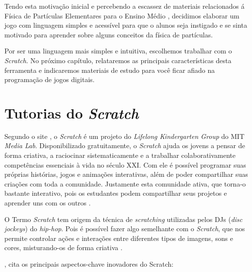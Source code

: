 \documentclass[12pt,fleqn]{book} %
\begin{document}
Tendo esta motivação inicial e percebendo a escassez de materiais relacionados á Física de Partículas Elementares para o Ensino Médio \cite{siqueira2005revisando}, decidimos elaborar um jogo com linguagem simples e acessível para que o alunos seja instigado e se sinta motivado para aprender sobre alguns conceitos da física de partículas.

Por ser uma linguagem mais simples e intuitiva, escolhemos trabalhar com o \textit{Scratch}. No próximo capítulo, relataremos as principais características desta ferramenta e indicaremos materiais de estudo para você ficar afiado na programação de jogos digitais. 







\chapter{Tutorias do \textit{Scratch}}

Segundo o site \textcite{on:scratch2018}, o \textit{Scratch} é um projeto do \textit{Lifelong Kindergarten Group} do MIT \textit{Media Lab}. Disponibilizado gratuitamente, o \textit{Scratch} ajuda os jovens a pensar de forma criativa, a raciocinar sistematicamente e a trabalhar colaborativamente competências essenciais à vida no século XXI. Com ele é possível programar suas próprias histórias, jogos e animações interativas, além de poder compartilhar suas criações com toda a comunidade. Justamente esta comunidade ativa, que torna-o bastante interativo, pois os estudantes podem compartilhar seus projetos e aprender uns com os outros .

O Termo \textit{Scratch} tem origem da técnica de \textit{scratching} utilizadas pelos DJs (\textit{disc jockeys}) do \textit{hip-hop}. Pois é possível fazer algo semelhante com o \textit{Scratch}, que nos permite controlar ações e interações entre diferentes tipos de imagens, sons e cores, misturando-os de forma criativa \cite{marques2009recuperar}.

, cita os principais aspectos-chave inovadores do Scratch:
\end{document}
